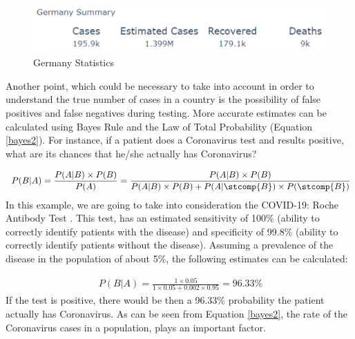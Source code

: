\begin{figure}[ht!]%
    \centering
    \includegraphics[width=0.85\linewidth]{latex/images/cov_g.pdf}
    \vspace{-0.2cm}
    \caption{Germany Statistics}
    \label{germ}
    \vspace{-0.2cm}
\end{figure}
\vspace{-0.5cm}
Another point, which could be necessary to take into account in order to understand the true number of cases in a country is the possibility of false positives and false negatives during testing. More accurate estimates can be calculated using Bayes Rule and the Law of Total Probability (Equation \ref{bayes2}). For instance, if a patient does a Coronavirus test and results positive, what are its chances that he/she actually has Coronavirus?

\useshortskip
\begin{align}
\ P(B|A) = \frac{P(A|B)\times P(B)}{P(A)} = \frac{P(A|B)\times P(B)}{P(A|B)\times P(B) + P(A|\stcomp{B})\times P(\stcomp{B})}
\label{bayes2}
\end{align}
\useshortskip
In this example, we are going to take into consideration the COVID-19: Roche Antibody Test \cite{roche}. This test, has an estimated sensitivity of 100\% (ability to correctly identify patients with the disease) and specificity of 99.8\% (ability to correctly identify patients without the disease). Assuming a prevalence of the disease in the population of about 5\%, the following estimates can be calculated:

\useshortskip
\begin{align}
\ P(B|A) = \frac{1 \times 0.05}{1 \times 0.05 + 0.002 \times 0.95} = 96.33\%
\end{align}
\useshortskip
If the test is positive, there would be then a 96.33\% probability the patient actually has Coronavirus. As can be seen from Equation \ref{bayes2}, the rate of the Coronavirus cases in a population, plays an important factor.

